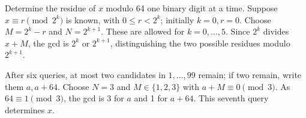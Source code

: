 Determine the residue of $x$ modulo 64 one binary digit at a time. Suppose $x\equiv r\pmod{2^k}$ is known, with $0\le r<2^k$; initially $k=0,r=0$. Choose $M=2^k-r$ and $N=2^{k+1}$. These are allowed for $k=0,\ldots,5$. Since $2^k$ divides $x+M$, the gcd is $2^k$ or $2^{k+1}$, distinguishing the two possible residues modulo $2^{k+1}$.

After six queries, at most two candidates in $1,\ldots,99$ remain; if two remain, write them $a,a+64$. Choose $N=3$ and $M\in\{1,2,3\}$ with $a+M\equiv0\pmod3$. As $64\equiv1\pmod3$, the gcd is 3 for $a$ and 1 for $a+64$. This seventh query determines $x$.
